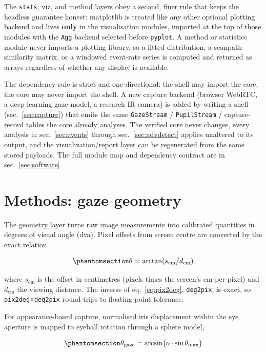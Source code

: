 \documentclass[
]{article}
\begin{document}
The \texttt{stats}, viz, and method layers obey a second, finer rule
that keeps the headless guarantee honest: matplotlib is treated like any
other optional plotting backend and lives \textbf{only} in the
visualisation modules, imported at the top of those modules with the
\texttt{Agg} backend selected before \texttt{pyplot}. A method or
statistics module never imports a plotting library, so a fitted
distribution, a scanpath-similarity matrix, or a windowed event-rate
series is computed and returned as arrays regardless of whether any
display is available.

The dependency rule is strict and one-directional: the shell may import
the core, the core may never import the shell. A new capture backend
(browser WebRTC, a deep-learning gaze model, a research IR camera) is
added by writing a shell (sec.~\ref{sec:capture}) that emits the same
\texttt{GazeStream} / \texttt{PupilStream} / capture-record tables the
core already analyses. The verified core never changes, every analysis
in sec.~\ref{sec:events} through sec.~\ref{sec:advdetect} applies
unaltered to its output, and the visualization/report layer can be
regenerated from the same stored payloads. The full module map and
dependency contract are in sec.~\ref{sec:software}.

\section{Methods: gaze geometry}\label{sec:geometry}

The geometry layer turns raw image measurements into calibrated
quantities in degrees of visual angle (dva). Pixel offsets from screen
centre are converted by the exact relation

\begin{equation}\phantomsection\label{eq:pix2deg}{ \theta = \arctan(s_\text{cm} / d_\text{cm}) }\end{equation}

where \(s_{\mathrm{cm}}\) is the offset in centimetres (pixels times the
screen's cm-per-pixel) and \(d_{\mathrm{cm}}\) the viewing distance. The
inverse of eq.~\ref{eq:pix2deg}, \texttt{deg2pix}, is exact, so
\texttt{pix2deg}∘\texttt{deg2pix} round-trips to floating-point
tolerance.

For appearance-based capture, normalised iris displacement within the
eye aperture is mapped to eyeball rotation through a sphere model,

\begin{equation}\phantomsection\label{eq:iris}{ \theta_{\mathrm{gaze}} = \arcsin\!\big(o \cdot \sin\theta_{\max}\big) }\end{equation}
\end{document}
